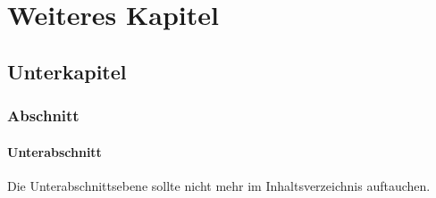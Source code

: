 \chapter{Weiteres Kapitel}

\section{Unterkapitel}

\subsection{Abschnitt}

\subsubsection{Unterabschnitt}

Die Unterabschnittsebene sollte nicht mehr im Inhaltsverzeichnis auftauchen.


